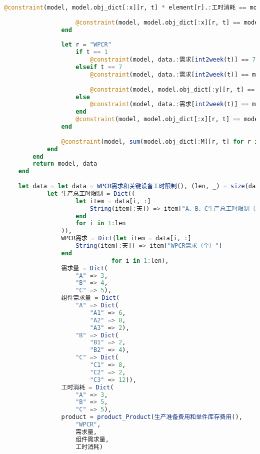 \begin{appendices}
\begin{lstlisting}[language=julia]
                    @constraint(model, model.obj_dict[:x][r, t] * element[r].:工时消耗 == model.obj_dict[:M][r, t] * model.obj_dict[:ω][r, t])
    
                    @constraint(model, model.obj_dict[:x][r, t] == model.obj_dict[:x][r, t] * model.obj_dict[:ω][r, t])
                end
    
                let r = "WPCR"
                    if t == 1
                        @constraint(model, data.:需求[int2week(t)] == 75 + model.obj_dict[:x][r, t] - model.obj_dict[:y][r, t])
                    elseif t == 7
                        @constraint(model, data.:需求[int2week(t)] == model.obj_dict[:y][r, t-1] + model.obj_dict[:x][r, t] - model.obj_dict[:y][r, t])
    
                        @constraint(model, model.obj_dict[:y][r, t] == 0)
                    else
                        @constraint(model, data.:需求[int2week(t)] == model.obj_dict[:y][r, t-1] + model.obj_dict[:x][r, t] - model.obj_dict[:y][r, t])
                    end
                    @constraint(model, model.obj_dict[:x][r, t] == model.obj_dict[:x][r, t] * model.obj_dict[:ω][r, t])
                end
    
                @constraint(model, sum(model.obj_dict[:M][r, t] for r in element_key) <= data.:生产总工时限制[int2week(t)])
            end
        end
        return model, data
    end
    
    let data = let data = WPCR需求和关键设备工时限制(), (len, _) = size(data)
            let 生产总工时限制 = Dict((
                    let item = data[i, :]
                        String(item[:天]) => item["A、B、C生产总工时限制（工时）"]
                    end
                    for i in 1:len
                )),
                WPCR需求 = Dict(let item = data[i, :]
                    String(item[:天]) => item["WPCR需求（个）"]
                end
                              for i in 1:len),
                需求量 = Dict(
                    "A" => 3,
                    "B" => 4,
                    "C" => 5),
                组件需求量 = Dict(
                    "A" => Dict(
                        "A1" => 6,
                        "A2" => 8,
                        "A3" => 2),
                    "B" => Dict(
                        "B1" => 2,
                        "B2" => 4),
                    "C" => Dict(
                        "C1" => 8,
                        "C2" => 2,
                        "C3" => 12)),
                工时消耗 = Dict(
                    "A" => 3,
                    "B" => 5,
                    "C" => 5),
                product = product_Product(生产准备费用和单件库存费用(),
                    "WPCR",
                    需求量,
                    组件需求量,
                    工时消耗)
    

\end{lstlisting}
\end{appendices}
